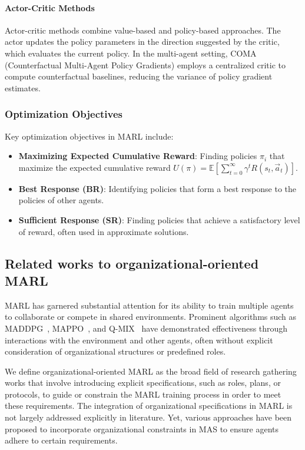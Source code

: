 \documentclass[conference]{IEEEtran}
\begin{document}
\paragraph{Actor-Critic Methods}

Actor-critic methods combine value-based and policy-based approaches. The actor updates the policy parameters in the direction suggested by the critic, which evaluates the current policy. In the multi-agent setting, COMA (Counterfactual Multi-Agent Policy Gradients) employs a centralized critic to compute counterfactual baselines, reducing the variance of policy gradient estimates.

\subsubsection{Optimization Objectives}

Key optimization objectives in MARL include:

\begin{itemize}
    \item \textbf{Maximizing Expected Cumulative Reward}: Finding policies $\pi_i$ that maximize the expected cumulative reward $U(\pi) = \mathbb{E}\left[\sum_{t=0}^{\infty} \gamma^t R(s_t, \vec{a}_t)\right]$.
    \item \textbf{Best Response (BR)}: Identifying policies that form a best response to the policies of other agents.
    \item \textbf{Sufficient Response (SR)}: Finding policies that achieve a satisfactory level of reward, often used in approximate solutions.
\end{itemize}


\subsection{Related works to organizational-oriented MARL}

MARL has garnered substantial attention for its ability to train multiple agents to collaborate or compete in shared environments. Prominent algorithms such as MADDPG~\cite{lowe2017multi}, MAPPO~\cite{yu2022surprising}, and Q-MIX~\cite{rashid2018qmix} have demonstrated effectiveness through interactions with the environment and other agents, often without explicit consideration of organizational structures or predefined roles.

We define organizational-oriented MARL as the broad field of research gathering works that involve introducing explicit specifications, such as roles, plans, or protocols, to guide or constrain the MARL training process in order to meet these requirements. The integration of organizational specifications in MARL is not largely addressed explicitly in literature. Yet, various approaches have been proposed to incorporate organizational constraints in MAS to ensure agents adhere to certain requirements.
\end{document}
